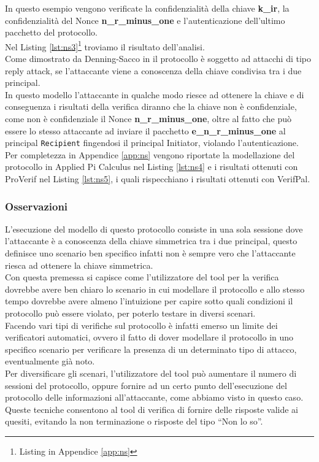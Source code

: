 

\noindent In questo esempio vengono verificate la confidenzialità della chiave \textbf{k\_ir}, la confidenzialità del Nonce \textbf{n\_r\_minus\_one} e l'autenticazione dell'ultimo pacchetto del protocollo.\\
Nel Listing \ref{lst:ns3}\footnote{Listing in Appendice \ref{app:ns}} troviamo il risultato dell'analisi.\\
Come dimostrato da Denning-Sacco in \cite{DS81} il protocollo è soggetto ad attacchi di tipo reply attack, se l'attaccante viene a conoscenza della chiave condivisa tra i due principal.\\
In questo modello l'attaccante in qualche modo riesce ad ottenere la chiave e di conseguenza i risultati della verifica diranno che la chiave non è confidenziale, come non è confidenziale il Nonce \textbf{n\_r\_minus\_one}, oltre al fatto che può essere lo stesso attaccante ad inviare il pacchetto \textbf{e\_n\_r\_minus\_one} al principal \texttt{Recipient} fingendosi il principal Initiator, violando l'autenticazione.\\
Per completezza in Appendice \ref{app:ns} vengono riportate la modellazione del protocollo in Applied Pi Calculus nel Listing \ref{lst:ns4} e i risultati ottenuti con ProVerif nel Listing \ref{lst:ns5}, i quali rispecchiano i risultati ottenuti con VerifPal.

\subsubsection*{Osservazioni}
L'esecuzione del modello di questo protocollo consiste in una sola sessione dove l'attaccante è a conoscenza della chiave simmetrica tra i due principal, questo definisce uno scenario ben specifico infatti non è sempre vero che l'attaccante riesca ad ottenere la chiave simmetrica.\\
Con questa premessa si capisce come l'utilizzatore del tool per la verifica dovrebbe avere ben chiaro lo scenario in cui modellare il protocollo e allo stesso tempo dovrebbe avere almeno l'intuizione per capire sotto quali condizioni il protocollo può essere violato, per poterlo testare in diversi scenari.\\
Facendo vari tipi di verifiche sul protocollo è infatti emerso un limite dei verificatori automatici, ovvero il fatto di dover modellare il protocollo in uno specifico scenario per verificare la presenza di un determinato tipo di attacco, eventualmente già noto.\\ 
Per diversificare gli scenari, l'utilizzatore del tool può aumentare il numero di sessioni del protocollo, oppure fornire ad un certo punto dell'esecuzione del protocollo delle informazioni all'attaccante, come abbiamo visto in questo caso.\\
Queste tecniche consentono al tool di verifica di fornire delle risposte valide ai quesiti, evitando la non terminazione o risposte del tipo ``Non lo so''. 
